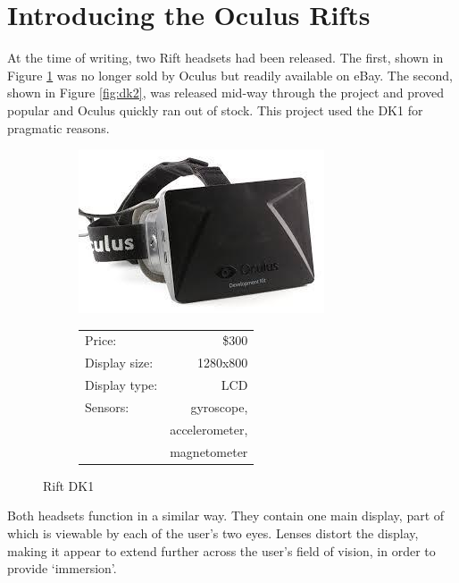 \documentclass[MSc,paper=a4,pagesize=auto]{icldt}
\begin{document}
\section{Introducing the Oculus Rifts}
At the time of writing, two Rift headsets had been released. The first, shown in Figure \ref{fig:dk1} was no longer sold by Oculus but readily available on eBay. The second, shown in Figure \ref{fig:dk2}, was released mid-way through the project and proved popular and Oculus quickly ran out of stock. This project used the DK1 for pragmatic reasons.

\begin{figure}[htbp!]
\centering
\begin{subfigure}{0.5\textwidth}
    \centering
    \includegraphics[width=1\linewidth]{resources/dk1}
\end{subfigure}%
\centering
\begin{subfigure}{0.5\textwidth}
    \centering
   	\begin{tabular}{ l r }
   	Price:      		& \$300 \\
  	Display size:	& 1280x800 \\
  	Display type:	& LCD \\
	Sensors:			& gyroscope,\\
					& accelerometer,\\
					& magnetometer\\
\end{tabular}
\end{subfigure} 
    \caption{Rift DK1}
    \label{fig:dk1}
\end{figure}

Both headsets function in a similar way. They contain one main display, part of which is viewable by each of the user's two eyes. Lenses distort the display, making it appear to extend further across the user's field of vision, in order to provide `immersion'. 
\end{document}
